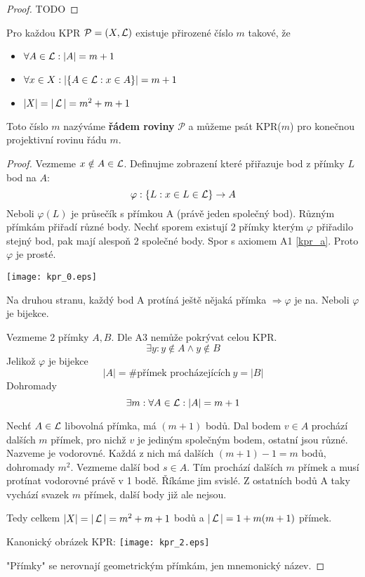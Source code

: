 \begin{proof}
    TODO
\end{proof}
\begin{theorem}
    Pro každou KPR $\mathcal{P}=(X,\operatorname{\mathcal{L}})$ existuje přirozené číslo $m$ takové, že
    \begin{itemize}
        \item $\forall A\in\operatorname{\mathcal{L}}: |A|=m+1$
        \item $\forall x\in X: |\{A\in\operatorname{\mathcal{L}}: x\in A\}|=m+1$
        \item $|X|=|\operatorname{\mathcal{L}}|=m^2+m+1$
    \end{itemize}

    Toto číslo $m$ nazýváme \textbf{řádem roviny} $\mathcal{P}$ a můžeme psát KPR($m$) pro konečnou projektivní rovinu řádu $m$.
\end{theorem}
\begin{proof}
	Vezmeme $x \notin A \in \operatorname{\mathcal{L}}$.
	Definujme zobrazení které přiřazuje bod z přímky $L$ bod na $A$:
	\[ \varphi:\{ L: x \in L \in \operatorname{\mathcal{L}} \} \to A \]
	Neboli $\varphi(L)$ je průsečík s přímkou A (právě jeden společný bod).
	Různým přímkám přiřadí různé body.
	Nechť sporem existují 2 přímky kterým $\varphi$ přiřadilo stejný bod, pak mají alespoň 2 společné body. Spor s axiomem A1 \cref{kpr_a}.
	Proto $\varphi$ je prosté.

	\texttt{[image: kpr\_0.eps]}

	Na druhou stranu, každý bod A protíná ještě nějaká přímka $\Rightarrow \varphi$ je na.
	Neboli $\varphi$ je bijekce.

	Vezmeme 2 přímky $A, B$. Dle A3 nemůže pokrývat celou KPR.
	\[ \exists y: y \notin A \land y \notin B \]
	Jelikož $\varphi$ je bijekce
	\[ |A| = \text{\# přímek procházejících}\ y = |B| \]
	Dohromady
	\[ \exists m: \forall A \in \operatorname{\mathcal{L}}: |A| = m + 1 \]

	Nechť $A \in \operatorname{\mathcal{L}}$ libovolná přímka, má $(m + 1)$ bodů.
	Dal bodem $v \in A$ prochází dalších $m$ přímek, pro nichž $v$ je jediným společným bodem, ostatní jsou různé.
	Nazveme je vodorovné.
	Každá z nich má dalších $(m + 1) - 1 = m$ bodů, dohromady $m^2$.
	Vezmeme další bod $s \in A$. Tím prochází dalších $m$ přímek a musí protínat vodorovné právě v 1 bodě.
	Říkáme jim svislé.
	Z ostatních bodů A taky vychází svazek $m$ přímek, další body již ale nejsou.

	Tedy celkem $|X|=|\operatorname{\mathcal{L}}|=m^2+m+1$ bodů a $|\operatorname{\mathcal{L}}| = 1 + m(m +1)$ přímek.

	Kanonický obrázek KPR:
	\texttt{[image: kpr\_2.eps]}

	"Přímky" se nerovnají geometrickým přímkám, jen mnemonický název.
\end{proof}
